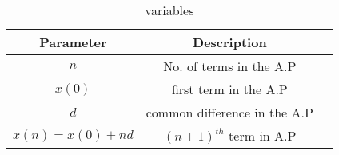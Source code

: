 \begin{table}[h]
  \centering
  \renewcommand{\arraystretch}{1.5}
\begin{tabular}{|c|c|c|}
\hline
Parameter & Description \\\hline
\( n \) & No. of terms in the A.P  \\\hline
\(x(0) \) & first term in the A.P \\\hline
\( d \) & common difference in the A.P  \\\hline
\(x(n)=x(0)+nd\) & $(n+1)^{th}$ term in A.P\\ \hline
\end{tabular}
\caption{variables}
\end{table}
